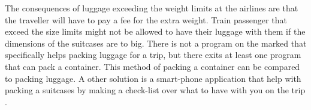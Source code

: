 The consequences of luggage exceeding the weight limits at the airlines are that the traveller will have to pay a fee for the extra weight.
Train passenger that exceed the size limits might not be allowed to have their luggage with them if the dimensions of the suitcases are to big.
There is not a program on the marked that specifically helps packing luggage for a trip, but there exits at least one program that can pack a container\citep{solvingmaze}. This method of packing a container can be compared to packing luggage. A other solution is a smart-phone application that help with packing a suitcases by making a check-list over what to have with you on the trip \citep{packingpro}.
